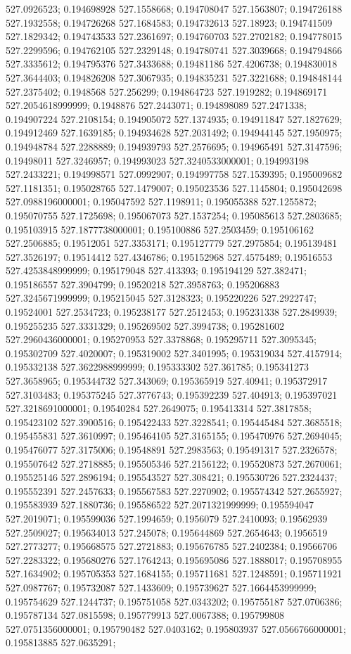 527.0926523; 0.194698928 527.1558668; 0.194708047 527.1563807; 0.194726188 527.1932558; 0.194726268 527.1684583; 0.194732613 527.18923; 0.194741509 527.1829342; 0.194743533 527.2361697; 0.194760703 527.2702182; 0.194778015 527.2299596; 0.194762105 527.2329148; 0.194780741 527.3039668; 0.194794866 527.3335612; 0.194795376 527.3433688; 0.19481186 527.4206738; 0.194830018 527.3644403; 0.194826208 527.3067935; 0.194835231 527.3221688; 0.194848144 527.2375402; 0.1948568 527.256299; 0.194864723 527.1919282; 0.194869171 527.2054618999999; 0.1948876 527.2443071; 0.194898089 527.2471338; 0.194907224 527.2108154; 0.194905072 527.1374935; 0.194911847 527.1827629; 0.194912469 527.1639185; 0.194934628 527.2031492; 0.194944145 527.1950975; 0.194948784 527.2288889; 0.194939793 527.2576695; 0.194965491 527.3147596; 0.19498011 527.3246957; 0.194993023 527.3240533000001; 0.194993198 527.2433221; 0.194998571 527.0992907; 0.194997758 527.1539395; 0.195009682 527.1181351; 0.195028765 527.1479007; 0.195023536 527.1145804; 0.195042698 527.0988196000001; 0.195047592 527.1198911; 0.195055388 527.1255872; 0.195070755 527.1725698; 0.195067073 527.1537254; 0.195085613 527.2803685; 0.195103915 527.1877738000001; 0.195100886 527.2503459; 0.195106162 527.2506885; 0.19512051 527.3353171; 0.195127779 527.2975854; 0.195139481 527.3526197; 0.19514412 527.4346786; 0.195152968 527.4575489; 0.19516553 527.4253848999999; 0.195179048 527.413393; 0.195194129 527.382471; 0.195186557 527.3904799; 0.19520218 527.3958763; 0.195206883 527.3245671999999; 0.195215045 527.3128323; 0.195220226 527.2922747; 0.19524001 527.2534723; 0.195238177 527.2512453; 0.195231338 527.2849939; 0.195255235 527.3331329; 0.195269502 527.3994738; 0.195281602 527.2960436000001; 0.195270953 527.3378868; 0.195295711 527.3095345; 0.195302709 527.4020007; 0.195319002 527.3401995; 0.195319034 527.4157914; 0.195332138 527.3622988999999; 0.195333302 527.361785; 0.195341273 527.3658965; 0.195344732 527.343069; 0.195365919 527.40941; 0.195372917 527.3103483; 0.195375245 527.3776743; 0.195392239 527.404913; 0.195397021 527.3218691000001; 0.19540284 527.2649075; 0.195413314 527.3817858; 0.195423102 527.3900516; 0.195422433 527.3228541; 0.195445484 527.3685518; 0.195455831 527.3610997; 0.195464105 527.3165155; 0.195470976 527.2694045; 0.195476077 527.3175006; 0.19548891 527.2983563; 0.195491317 527.2326578; 0.195507642 527.2718885; 0.195505346 527.2156122; 0.195520873 527.2670061; 0.195525146 527.2896194; 0.195543527 527.308421; 0.195530726 527.2324437; 0.195552391 527.2457633; 0.195567583 527.2270902; 0.195574342 527.2655927; 0.195583939 527.1880736; 0.195586522 527.2071321999999; 0.195594047 527.2019071; 0.195599036 527.1994659; 0.1956079 527.2410093; 0.19562939 527.2509027; 0.195634013 527.245078; 0.195644869 527.2654643; 0.1956519 527.2773277; 0.195668575 527.2721883; 0.195676785 527.2402384; 0.19566706 527.2283322; 0.195680276 527.1764243; 0.195695086 527.1888017; 0.195708955 527.1634902; 0.195705353 527.1684155; 0.195711681 527.1248591; 0.195711921 527.0987767; 0.195732087 527.1433609; 0.195739627 527.1664453999999; 0.195754629 527.1244737; 0.195751058 527.0343202; 0.195755187 527.0706386; 0.195787134 527.0815598; 0.195779913 527.0067388; 0.195799808 527.0751356000001; 0.195790482 527.0403162; 0.195803937 527.0566766000001; 0.195813885 527.0635291; 